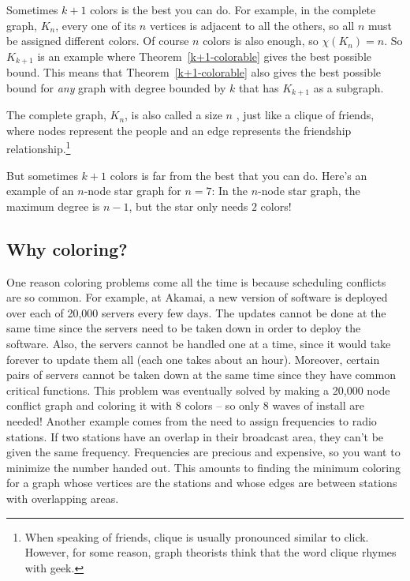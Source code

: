 Sometimes $k+1$ colors is the best you can do.  For example, in the
complete graph, $K_n$, every one of its $n$ vertices is adjacent to all
the others, so all $n$ must be assigned different colors.  Of course $n$
colors is also enough, so $\chi(K_n)=n$.  So $K_{k+1}$ is an example where
Theorem~\ref{k+1-colorable} gives the best possible bound.  This means
that Theorem~\ref{k+1-colorable} also gives the best possible bound for
\emph{any} graph with degree bounded by $k$ that has $K_{k+1}$ as a
subgraph.
\begin{staffnotes}

The complete graph, $K_n$, is also called a size $n$ ,
just like a clique of friends, where nodes represent the people and an
edge represents the friendship relationship.\footnote{ When speaking
of friends, clique is usually pronounced similar to click.  However,
for some reason, graph theorists think that the word clique rhymes
with geek.}

\end{staffnotes}
But sometimes $k+1$ colors is far from the best that you can do.  Here's
an example of an $n$-node star graph for $n=7$:
In the $n$-node star graph, the maximum degree is $n-1$, but the star only
needs $2$ colors!

\subsection{Why coloring?}

One reason coloring problems come all the time is because scheduling
conflicts are so common.  For example, at Akamai, a new version of
software is deployed over each of 20,000 servers every few days.  The
updates cannot be done at the same time since the servers need to be taken
down in order to deploy the software.  Also, the servers cannot be handled
one at a time, since it would take forever to update them all (each one
takes about an hour).  Moreover, certain pairs of servers cannot be taken
down at the same time since they have common critical functions.  This
problem was eventually solved by making a 20,000 node conflict graph and
coloring it with 8 colors -- so only 8 waves of install are needed!
Another example comes from the need to assign frequencies to radio
stations.  If two stations have an overlap in their broadcast area, they
can't be given the same frequency.  Frequencies are precious and
expensive, so you want to minimize the number handed out.  This amounts to
finding the minimum coloring for a graph whose vertices are the stations
and whose edges are between stations with overlapping areas.

